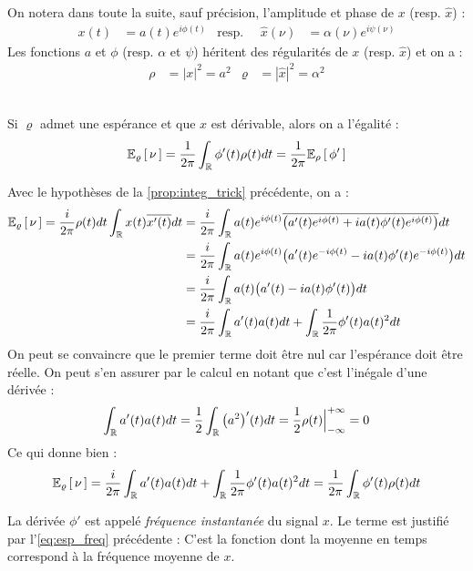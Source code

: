 On notera dans toute la suite, sauf précision, l'amplitude et phase de $x$ (resp. $\hat{x}$) :
\begin{align*}
	x(t) &= a(t) e^{i\phi(t)}  &  \text{resp. }\quad \hat{x}(\nu) &= \alpha(\nu) e^{i\psi(\nu)}
\end{align*}
Les fonctions $a$ et $\phi$ (resp. $\alpha$ et $\psi$) héritent des régularités de $x$ (resp. $\hat{x}$) et on a :
\begin{align*}
	\rho &= |x|^2 = a^2  &  \varrho &= |\hat{x}|^2 = \alpha^2
\end{align*}
\\

\begin{proposition}\label{prop.esp_freq}
	Si $\varrho$ admet une espérance et que $x$ est dérivable, alors on a l'égalité :
	\begin{equation}\label{eq:esp_freq}
		\esp[\varrho]{\nu} = \frac{1}{2\pi}\int_\R \phi'(t)\rho(t)dt = \frac{1}{2\pi} \esp[\rho]{\phi'}
	\end{equation}
	
\begin{demo} 
	Avec le hypothèses de la \cref{prop:integ_trick} précédente, on a :
	\begin{align*}
		\esp[\varrho]{\nu} = \frac{i}{2\pi} \rho(t)dt\int_\R x(t) \congu{x'(t)} dt &= \frac{i}{2\pi}\int_\R a(t)e^{i\phi(t)}\congu{\big( a'(t)e^{i\phi(t)}+ ia(t)\phi'(t)e^{i\phi(t)} \big)} dt \\
		&= \frac{i}{2\pi}\int_\R a(t)e^{i\phi(t)}\big( a'(t)e^{-i\phi(t)} -ia(t)\phi'(t)e^{-i\phi(t)} \big) dt \\
		&= \frac{i}{2\pi}\int_\R a(t)\big( a'(t)- ia(t)\phi'(t)\big) dt \\
		&= \frac{i}{2\pi}\int_\R a'(t)a(t) dt + \int_\R  \frac{1}{2\pi}\phi'(t)a(t)^2 dt \\
	\end{align*}
	On peut se convaincre que le premier terme doit être nul car l'espérance doit être réelle. On peut s'en assurer par le calcul en notant que c'est l’inégale d'une dérivée :
	\[\int_\R a'(t)a(t) dt = \frac{1}{2} \int_\R \big(a^2\big)'(t) dt = \frac{1}{2}\rho(t)\Big|_{-\infty}^{+\infty} = 0\]
	Ce qui donne bien :
	\[\esp[\varrho]{\nu} = \frac{i}{2\pi}\int_\R a'(t)a(t) dt + \int_\R  \frac{1}{2\pi}\phi'(t)a(t)^2 dt = \frac{1}{2\pi}\int_\R \phi'(t)\rho(t) dt\]
\end{demo}
\end{proposition}

\begin{definition}
	La dérivée $\phi'$ est appelé \emph{fréquence instantanée} du signal $x$. Le terme est justifié par l'\cref{eq:esp_freq} précédente : C'est la fonction dont la moyenne en temps correspond à la fréquence moyenne de $x$.
\end{definition}

